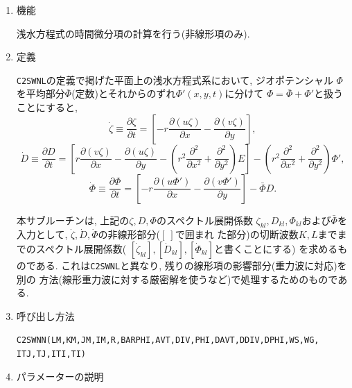\documentclass[a4j,fleqn]{jarticle}
\begin{document}
\begin{enumerate}

\item 機能 

浅水方程式の時間微分項の計算を行う(非線形項のみ).

\item 定義

{\tt C2SWNL}の定義で掲げた平面上の浅水方程式系において, ジオポテンシャル
$\Phi$を平均部分$\bar\Phi$(定数)とそれからのずれ$\Phi'(x,y,t)$に分けて
$\Phi=\bar\Phi+\Phi'$と扱うことにすると, 
\begin{equation}
\dot{\zeta}\equiv\frac{\partial \zeta}{\partial t}
=\left[-r\frac{\partial(u\zeta)}{\partial x}
 -\frac{\partial(v\zeta)}{\partial y}\right],
\end{equation}
\begin{equation}
\dot{D}\equiv\frac{\partial D}{\partial t}
=\left[r\frac{\partial(v\zeta)}{\partial x}
-\frac{\partial(u\zeta)}{\partial y}
 -\left(r^2\frac{\partial^2}{\partial x^2}
  +\frac{\partial^2}{\partial y^2}\right)E\right]
 -\left(r^2\frac{\partial^2}{\partial x^2}
  +\frac{\partial^2}{\partial y^2}\right)\Phi',
\end{equation}
\begin{equation}
\dot{\Phi}\equiv\frac{\partial \Phi}{\partial t}
=\left[-r\frac{\partial(u\Phi')}{\partial x}
-\frac{\partial(v\Phi')}{\partial y}\right]-\bar\Phi D.
\end{equation}

本サブルーチンは, 上記の$\zeta,D,\Phi$のスペクトル展開係数
$\zeta_{kl},D_{kl},\Phi_{kl}$および$\bar\Phi$を入力として,
$\dot{\zeta},\dot{D},\dot{\Phi}$の非線形部分($\left[\ \right]$で囲まれ
た部分)の切断波数$K,L$までまでのスペクトル展開係数(
$[ \dot{\zeta}_{kl}],[\dot{D}_{kl}],[\dot{\Phi}_{kl}]$と書くことにする)
を求めるものである.
これは{\tt C2SWNL}と異なり, 残りの線形項の影響部分(重力波に対応)を別の
方法(線形重力波に対する厳密解を使うなど)で処理するためのものである.

\item 呼び出し方法 

{\tt C2SWNN(LM,KM,JM,IM,R,BARPHI,AVT,DIV,PHI,DAVT,DDIV,DPHI,WS,WG,
ITJ,TJ,ITI,TI)}
  
\item パラメーターの説明


\end{enumerate}
\end{document}
